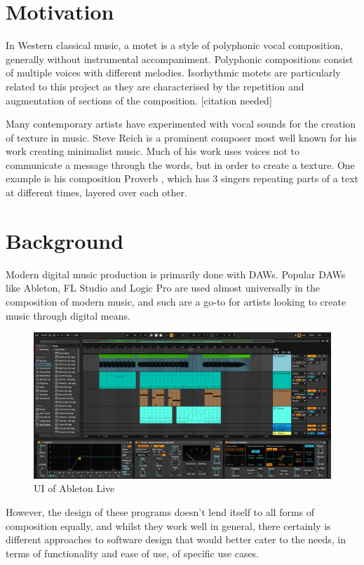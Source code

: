 \documentclass[12pt,a4paper,twoside,openright]{report}
\begin{document}
\section{Motivation}
In Western classical music, a motet is a style of polyphonic vocal composition, generally without instrumental accompaniment. Polyphonic compositions consist of multiple voices with different melodies. Isorhythmic motets are particularly related to this project as they are characterised by the repetition and augmentation of sections of the composition. [citation needed] 

Many contemporary artists have experimented with vocal sounds for the creation of texture in music. Steve Reich is a prominent composer most well known for his work creating minimalist music. Much of his work uses voices not to communicate a message through the words, but in order to create a texture. One example is his composition Proverb \cite{ReichProverb}, which has 3 singers repeating parts of a text at different times, layered over each other.

\section{Background}
 Modern digital music production is primarily done with DAWs. Popular DAWs like Ableton, FL Studio and Logic Pro are used almost universally in the composition of modern music, and such are a go-to for artists looking to create music through digital means. 

\begin{figure}[h]
    \centering
    \includegraphics[scale=0.3]{images/ableton example.png}
    \caption{UI of Ableton Live}
    \label{fig:ableton}
\end{figure}

However, the design of these programs doesn't lend itself to all forms of composition equally, and whilst they work well in general, there certainly is different approaches to software design that would better cater to the needs, in terms of functionality and ease of use, of specific use cases.
\end{document}
